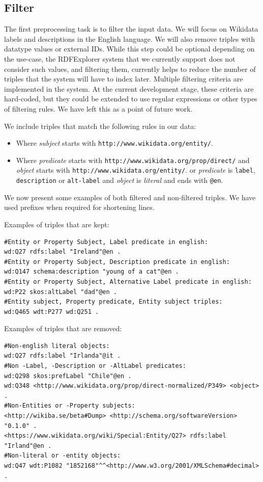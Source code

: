 \subsection{Filter}

The first preprocessing task is to filter the input data. 
We will focus on Wikidata labels and descriptions in the English language. 
We will also remove triples with datatype values or external IDs.
While this step could be optional depending on the use-case, the RDFExplorer system that we currently support does not consider such values, and filtering them, currently helps to reduce the number of triples that the system will have to index later. 
Multiple filtering criteria are implemented in the system. 
At the current development stage, these criteria are hard-coded, but they could be extended to use regular expressions or other types of filtering rules. We have left this as a point of future work.

We include triples that match the following rules in our data:
\begin{itemize}
    \item Where \textit{subject} starts with \texttt{http://www.wikidata.org/entity/}.
    \item Where \textit{predicate} starts with \texttt{http://www.wikidata.org/prop/direct/} 
            \subsubitem and \textit{object} starts with \texttt{http://www.wikidata.org/entity/}.
        \subitem or \textit{predicate} is \texttt{label}, \texttt{description} or \texttt{alt-label} 
            \subsubitem and \textit{object} is \textit{literal} and ends with \texttt{@en}.
\end{itemize}

\begin{example}
We now present some examples of both filtered and non-filtered triples.
We have used prefixes when required for shortening lines.

Examples of triples that are kept:
\begin{verbatim}
#Entity or Property Subject, Label predicate in english:
wd:Q27 rdfs:label "Ireland"@en .
#Entity or Property Subject, Description predicate in english:
wd:Q147 schema:description "young of a cat"@en .
#Entity or Property Subject, Alternative Label predicate in english:
wd:P22 skos:altLabel "dad"@en .
#Entity subject, Property predicate, Entity subject triples:
wd:Q465 wdt:P277 wd:Q251 .
\end{verbatim}

Examples of triples that are removed:
\begin{verbatim}
#Non-english literal objects:
wd:Q27 rdfs:label "Irlanda"@it .
#Non -Label, -Description or -AltLabel predicates:
wd:Q298 skos:prefLabel "Chile"@en .
wd:Q348 <http://www.wikidata.org/prop/direct-normalized/P349> <object> .
#Non-Entities or -Property subjects:
<http://wikiba.se/beta#Dump> <http://schema.org/softwareVersion> "0.1.0" .
<https://www.wikidata.org/wiki/Special:Entity/Q27> rdfs:label "Irland"@en .
#Non-literal or -entity objects:
wd:Q47 wdt:P1082 "1852168"^^<http://www.w3.org/2001/XMLSchema#decimal> .
\end{verbatim}
\end{example}

